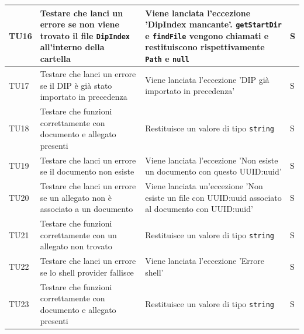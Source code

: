 \documentclass[a4paper,12pt]{article}
\begin{document}
\begin{longtable}{|M{1.2cm}|M{5cm}|M{8cm}|M{1.5cm}|}
            TU16 & Testare che \texttt{} lanci un errore se non viene trovato il file \texttt{DipIndex} all'interno della cartella & Viene lanciata l'eccezione 'DipIndex mancante'. \texttt{getStartDir} e \texttt{findFile} vengono chiamati e restituiscono rispettivamente \texttt{Path} e \texttt{null} & S \\
            \hline

            TU17 & Testare che \texttt{} lanci un errore se il DIP è già stato importato in precedenza & Viene lanciata l'eccezione 'DIP già importato in precedenza' & S \\
            \hline

            TU18 & Testare che \texttt{} funzioni correttamente con documento e allegato presenti & Restituisce un valore di tipo \texttt{string} & S \\
            \hline

            TU19 & Testare che \texttt{} lanci un errore se il documento non esiste & Viene lanciata l'eccezione 'Non esiste un documento con questo UUID:uuid' & S \\
            \hline

            TU20 & Testare che \texttt{} lanci un errore se un allegato non è associato a un documento & Viene lanciata un'eccezione 'Non esiste un file con UUID:uuid associato al documento con UUID:uuid' & S \\
            \hline

            TU21 & Testare che \texttt{} funzioni correttamente con un allegato non trovato & Restituisce un valore di tipo \texttt{string} & S \\
            \hline

            TU22 & Testare che \texttt{} lanci un errore se lo shell provider fallisce & Viene lanciata l'eccezione 'Errore shell' & S \\
            \hline

            TU23 & Testare che \texttt{} funzioni correttamente con documento e allegato presenti & Restituisce un valore di tipo \texttt{string} & S \\
            \hline


\end{longtable}
\end{document}
